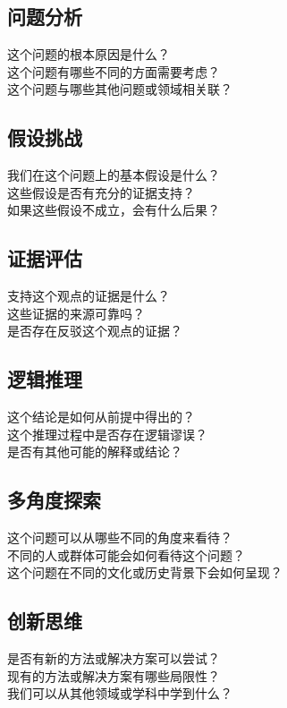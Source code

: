 \documentclass[12pt]{book}
\begin{document}
\subsection{问题分析}
这个问题的根本原因是什么？\\
这个问题有哪些不同的方面需要考虑？\\
这个问题与哪些其他问题或领域相关联？\\

\subsection{假设挑战}
我们在这个问题上的基本假设是什么？\\
这些假设是否有充分的证据支持？\\
如果这些假设不成立，会有什么后果？\\

\subsection{证据评估}
支持这个观点的证据是什么？\\
这些证据的来源可靠吗？\\
是否存在反驳这个观点的证据？\\

\subsection{逻辑推理}
这个结论是如何从前提中得出的？\\
这个推理过程中是否存在逻辑谬误？\\
是否有其他可能的解释或结论？\\

\subsection{多角度探索}
这个问题可以从哪些不同的角度来看待？\\
不同的人或群体可能会如何看待这个问题？\\
这个问题在不同的文化或历史背景下会如何呈现？\\

\subsection{创新思维}
是否有新的方法或解决方案可以尝试？\\
现有的方法或解决方案有哪些局限性？\\
我们可以从其他领域或学科中学到什么？\\
\end{document}
